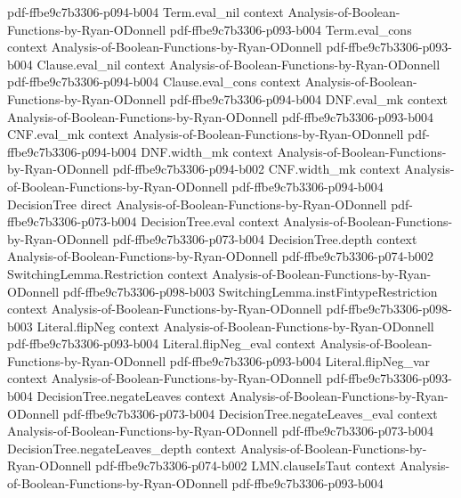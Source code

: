 \begin{theorem}
  {pdf-ffbe9c7b3306-p094-b004}
\proofstep
  {Term.eval_nil}
  {context}
  {Analysis-of-Boolean-Functions-by-Ryan-ODonnell}
  {pdf-ffbe9c7b3306-p093-b004}
\proofstep
  {Term.eval_cons}
  {context}
  {Analysis-of-Boolean-Functions-by-Ryan-ODonnell}
  {pdf-ffbe9c7b3306-p093-b004}
\proofstep
  {Clause.eval_nil}
  {context}
  {Analysis-of-Boolean-Functions-by-Ryan-ODonnell}
  {pdf-ffbe9c7b3306-p094-b004}
\proofstep
  {Clause.eval_cons}
  {context}
  {Analysis-of-Boolean-Functions-by-Ryan-ODonnell}
  {pdf-ffbe9c7b3306-p094-b004}
\proofstep
  {DNF.eval_mk}
  {context}
  {Analysis-of-Boolean-Functions-by-Ryan-ODonnell}
  {pdf-ffbe9c7b3306-p093-b004}
\proofstep
  {CNF.eval_mk}
  {context}
  {Analysis-of-Boolean-Functions-by-Ryan-ODonnell}
  {pdf-ffbe9c7b3306-p094-b004}
\proofstep
  {DNF.width_mk}
  {context}
  {Analysis-of-Boolean-Functions-by-Ryan-ODonnell}
  {pdf-ffbe9c7b3306-p094-b002}
\proofstep
  {CNF.width_mk}
  {context}
  {Analysis-of-Boolean-Functions-by-Ryan-ODonnell}
  {pdf-ffbe9c7b3306-p094-b004}
\proofstep
  {DecisionTree}
  {direct}
  {Analysis-of-Boolean-Functions-by-Ryan-ODonnell}
  {pdf-ffbe9c7b3306-p073-b004}
\proofstep
  {DecisionTree.eval}
  {context}
  {Analysis-of-Boolean-Functions-by-Ryan-ODonnell}
  {pdf-ffbe9c7b3306-p073-b004}
\proofstep
  {DecisionTree.depth}
  {context}
  {Analysis-of-Boolean-Functions-by-Ryan-ODonnell}
  {pdf-ffbe9c7b3306-p074-b002}
\proofstep
  {SwitchingLemma.Restriction}
  {context}
  {Analysis-of-Boolean-Functions-by-Ryan-ODonnell}
  {pdf-ffbe9c7b3306-p098-b003}
\proofstep
  {SwitchingLemma.instFintypeRestriction}
  {context}
  {Analysis-of-Boolean-Functions-by-Ryan-ODonnell}
  {pdf-ffbe9c7b3306-p098-b003}
\proofstep
  {Literal.flipNeg}
  {context}
  {Analysis-of-Boolean-Functions-by-Ryan-ODonnell}
  {pdf-ffbe9c7b3306-p093-b004}
\proofstep
  {Literal.flipNeg_eval}
  {context}
  {Analysis-of-Boolean-Functions-by-Ryan-ODonnell}
  {pdf-ffbe9c7b3306-p093-b004}
\proofstep
  {Literal.flipNeg_var}
  {context}
  {Analysis-of-Boolean-Functions-by-Ryan-ODonnell}
  {pdf-ffbe9c7b3306-p093-b004}
\proofstep
  {DecisionTree.negateLeaves}
  {context}
  {Analysis-of-Boolean-Functions-by-Ryan-ODonnell}
  {pdf-ffbe9c7b3306-p073-b004}
\proofstep
  {DecisionTree.negateLeaves_eval}
  {context}
  {Analysis-of-Boolean-Functions-by-Ryan-ODonnell}
  {pdf-ffbe9c7b3306-p073-b004}
\proofstep
  {DecisionTree.negateLeaves_depth}
  {context}
  {Analysis-of-Boolean-Functions-by-Ryan-ODonnell}
  {pdf-ffbe9c7b3306-p074-b002}
\proofstep
  {LMN.clauseIsTaut}
  {context}
  {Analysis-of-Boolean-Functions-by-Ryan-ODonnell}
  {pdf-ffbe9c7b3306-p093-b004}

\end{theorem}
